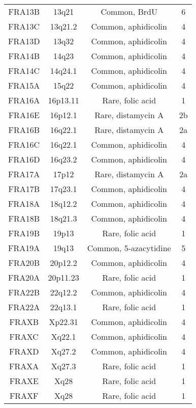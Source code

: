 \begin{center}
\begin{longtable}{cccc}
FRA13B & 13q21    & Common, BrdU          & 6 \\
FRA13C & 13q21.2  & Common, aphidicolin   & 4 \\
FRA13D & 13q32    & Common, aphidicolin   & 4 \\
FRA14B & 14q23    & Common, aphidicolin   & 4 \\
FRA14C & 14q24.1  & Common, aphidicolin   & 4 \\
FRA15A & 15q22    & Common, aphidicolin   & 4 \\
FRA16A & 16p13.11 & Rare, folic acid      & 1 \\
FRA16E & 16p12.1  & Rare, distamycin A    & 2b \\
FRA16B & 16q22.1  & Rare, distamycin A    & 2a \\
FRA16C & 16q22.1  & Common, aphidicolin   & 4 \\
FRA16D & 16q23.2  & Common, aphidicolin   & 4 \\
FRA17A & 17p12    & Rare, distamycin A    & 2a \\
FRA17B & 17q23.1  & Common, aphidicolin   & 4 \\
FRA18A & 18q12.2  & Common, aphidicolin   & 4 \\
FRA18B & 18q21.3  & Common, aphidicolin   & 4 \\
FRA19B & 19p13    & Rare, folic acid      & 1 \\
FRA19A & 19q13    & Common, 5-azacytidine & 5 \\
FRA20B & 20p12.2  & Common, aphidicolin   & 4 \\
FRA20A & 20p11.23 & Rare, folic acid      & 1 \\
FRA22B & 22q12.2  & Common, aphidicolin   & 4 \\
FRA22A & 22q13.1  & Rare, folic acid      & 1 \\
FRAXB  & Xp22.31  & Common, aphidicolin   & 4 \\
FRAXC  & Xq22.1   & Common, aphidicolin   & 4 \\
FRAXD  & Xq27.2   & Common, aphidicolin   & 4 \\
FRAXA  & Xq27.3   & Rare, folic acid      & 1 \\
FRAXE  & Xq28     & Rare, folic acid      & 1 \\
FRAXF  & Xq28     & Rare, folic acid      & 1 \\
\end{longtable}
\end{center}
